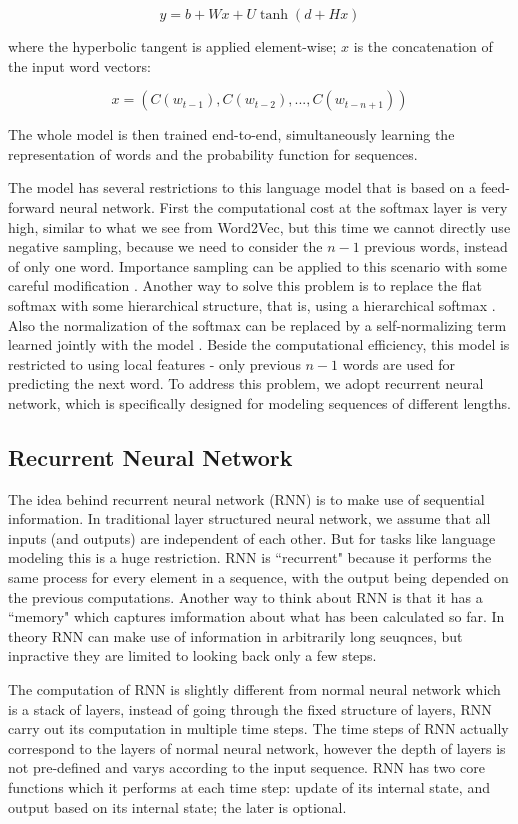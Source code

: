 $$y=b+Wx+U\tanh(d+Hx)$$

where the hyperbolic tangent is applied element-wise; $x$ is the concatenation of the input word vectors:

$$x=(C(w_{t-1}), C(w_{t-2}), ..., C(w_{t-n+1}))$$

The whole model is then trained end-to-end, simultaneously learning the representation of words and the probability function for sequences.

The model has several restrictions to this language model that is based on a feed-forward neural network. First the computational cost at the softmax layer is very high, similar to what we see from Word2Vec, but this time we cannot directly use negative sampling, because we need to consider the $n-1$ previous words, instead of only one word. Importance sampling can be applied to this scenario with some careful modification \cite{cho2015on}. Another way to solve this problem is to replace the flat softmax with some hierarchical structure, that is, using a hierarchical softmax \cite{mikolov2013efficient}. Also the normalization of the softmax can be replaced by a self-normalizing term learned jointly with the model \cite{devlin2014fast}. Beside the computational efficiency, this model is restricted to using local features - only previous $n-1$ words are used for predicting the next word. To address this problem, we adopt recurrent neural network, which is specifically designed for modeling sequences of different lengths.

\subsection{Recurrent Neural Network}

The idea behind recurrent neural network (RNN) is to make use of sequential information. In traditional layer structured neural network, we assume that all inputs (and outputs) are independent of each other. But for tasks like language modeling this is a huge restriction. RNN is ``recurrent" because it performs the same process for every element in a sequence, with the output being depended on the previous computations. Another way to think about RNN is that it has a ``memory" which captures imformation about what has been calculated so far. In theory RNN can make use of information in arbitrarily long seuqnces, but inpractive they are limited to looking back only a few steps.

The computation of RNN is slightly different from normal neural network which is a stack of layers, instead of going through the fixed structure of layers, RNN carry out its computation in multiple time steps. The time steps of RNN actually correspond to the layers of normal neural network, however the depth of layers is not pre-defined and varys according to the input sequence. RNN has two core functions which it performs at each time step: update of its internal state, and output based on its internal state; the later is optional.


